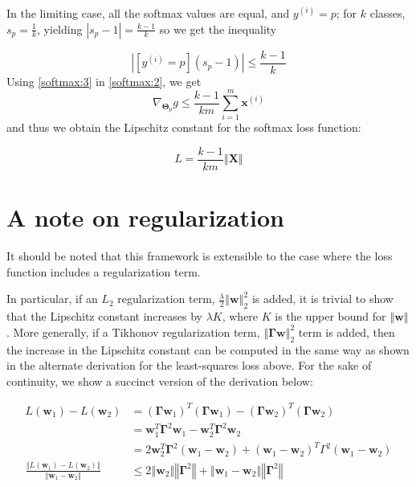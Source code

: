 \documentclass{article}
\begin{document}
In the limiting case, all the softmax values are equal, and $y^{(i)} = p$; for $k$ classes, $s_p = \frac{1}{k}$, yielding $|s_p-1| = \frac{k-1}{k}$ so we get the inequality

\begin{equation}
    |[y^{(i)} = p](s_p-1)| \leq \frac{k-1}{k} \label{softmax:3}
\end{equation}
Using \eqref{softmax:3} in \eqref{softmax:2}, we get
\[
    \nabla_{\boldsymbol\Theta_p} g \leq \frac{k-1}{km} \sum\limits_{i=1}^m \textbf{x}^{(i)}
\]
and thus we obtain the Lipschitz constant for the softmax loss function:

\[
    \boxed{
        L = \frac{k-1}{km}\left\Vert \textbf{X} \right\Vert
    }
\]

\section{A note on regularization}
It should be noted that this framework is extensible to the case where the loss function includes a regularization term. 

In particular, if an $L_2$ regularization term, $\frac{\lambda}{2}\left\Vert \textbf{w} \right\Vert_2^2$ is added, it is trivial to show that the Lipschitz constant increases by $\lambda K$, where $K$ is the upper bound for $\left\Vert \textbf{w} \right\Vert$. More generally, if a Tikhonov regularization term, $\left\Vert \boldsymbol\Gamma \textbf{w} \right\Vert_2^2$ term is added, then the increase in the Lipschitz constant can be computed in the same way as shown in the alternate derivation for the least-squares loss above. For the sake of continuity, we show a succinct version of the derivation below:

\[
    \begin{aligned}
        L(\textbf{w}_1) - L(\textbf{w}_2) &= (\boldsymbol\Gamma \textbf{w}_1)^T (\boldsymbol\Gamma \textbf{w}_1) - (\boldsymbol\Gamma \textbf{w}_2)^T (\boldsymbol\Gamma \textbf{w}_2) \\
        &= \textbf{w}_1^T \boldsymbol\Gamma^2 \textbf{w}_1 - \textbf{w}_2^T \boldsymbol\Gamma^2 \textbf{w}_2 \\
        &= 2\textbf{w}_2^T \boldsymbol\Gamma^2 (\textbf{w}_1 - \textbf{w}_2) + (\textbf{w}_1-\textbf{w}_2)^T \Gamma^2 (\textbf{w}_1-\textbf{w}_2) \\
        \frac{\left\Vert L(\textbf{w}_1) - L(\textbf{w}_2) \right\Vert}{\left\Vert \textbf{w}_1-\textbf{w}_2 \right\Vert} & \leq 2 \left\Vert \textbf{w}_2 \right\Vert \left\Vert \boldsymbol\Gamma^2 \right\Vert + \left\Vert \textbf{w}_1-\textbf{w}_2 \right\Vert \left\Vert \boldsymbol\Gamma^2 \right\Vert 
    \end{aligned}
\]
\end{document}
